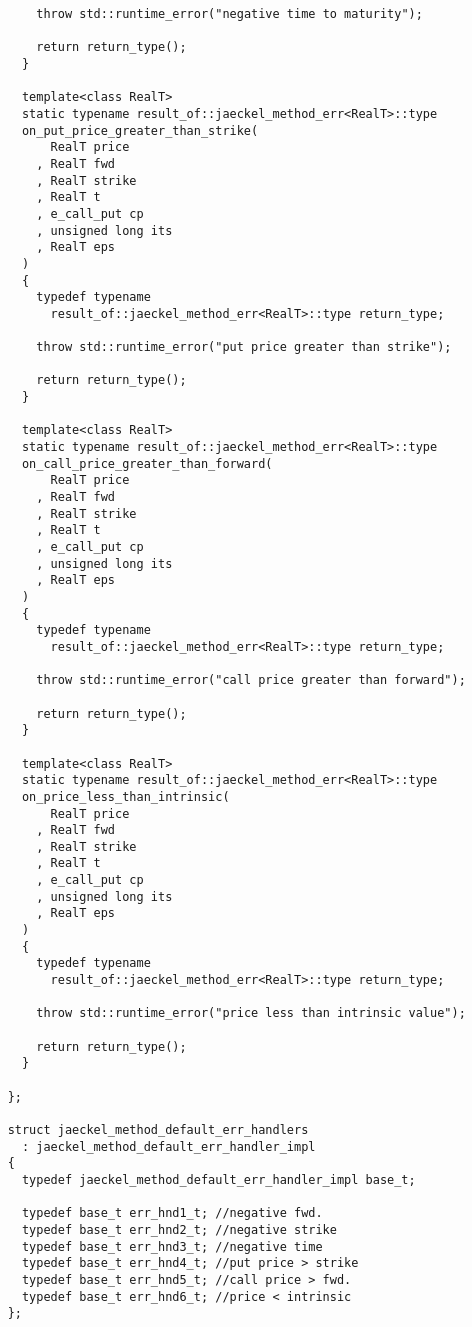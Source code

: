 \documentclass[a4paper,twoside,twocolumn]{article}
\begin{document}
\begin{verbatim}
        throw std::runtime_error("negative time to maturity");
    
        return return_type();
      }
      
      template<class RealT>
      static typename result_of::jaeckel_method_err<RealT>::type
      on_put_price_greater_than_strike(
          RealT price
        , RealT fwd
        , RealT strike
        , RealT t
        , e_call_put cp
        , unsigned long its
        , RealT eps
      )
      {
        typedef typename
          result_of::jaeckel_method_err<RealT>::type return_type;

        throw std::runtime_error("put price greater than strike");

        return return_type();
      }

      template<class RealT>
      static typename result_of::jaeckel_method_err<RealT>::type
      on_call_price_greater_than_forward(
          RealT price
        , RealT fwd
        , RealT strike
        , RealT t
        , e_call_put cp
        , unsigned long its
        , RealT eps
      )
      {
        typedef typename
          result_of::jaeckel_method_err<RealT>::type return_type;

        throw std::runtime_error("call price greater than forward");

        return return_type();
      }

      template<class RealT>
      static typename result_of::jaeckel_method_err<RealT>::type
      on_price_less_than_intrinsic(
          RealT price
        , RealT fwd
        , RealT strike
        , RealT t
        , e_call_put cp
        , unsigned long its
        , RealT eps
      )
      {
        typedef typename
          result_of::jaeckel_method_err<RealT>::type return_type;

        throw std::runtime_error("price less than intrinsic value");

        return return_type();
      }
      
    };

    struct jaeckel_method_default_err_handlers
      : jaeckel_method_default_err_handler_impl
    {
      typedef jaeckel_method_default_err_handler_impl base_t;

      typedef base_t err_hnd1_t; //negative fwd.
      typedef base_t err_hnd2_t; //negative strike
      typedef base_t err_hnd3_t; //negative time
      typedef base_t err_hnd4_t; //put price > strike
      typedef base_t err_hnd5_t; //call price > fwd.
      typedef base_t err_hnd6_t; //price < intrinsic
    };


\end{verbatim}
\end{document}
